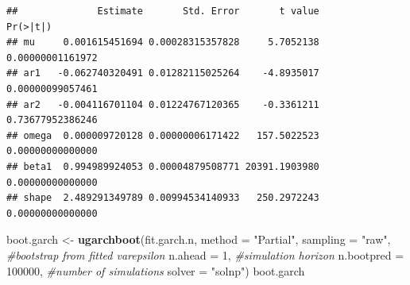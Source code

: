 \documentclass[
]{book}
\newenvironment{Shaded}{\begin{snugshade}}{\end{snugshade}}
\newcommand{\AttributeTok}[1]{\textcolor[rgb]{0.13,0.29,0.53}{#1}}
\newcommand{\CommentTok}[1]{\textcolor[rgb]{0.56,0.35,0.01}{\textit{#1}}}
\newcommand{\DecValTok}[1]{\textcolor[rgb]{0.00,0.00,0.81}{#1}}
\newcommand{\FunctionTok}[1]{\textcolor[rgb]{0.13,0.29,0.53}{\textbf{#1}}}
\newcommand{\NormalTok}[1]{#1}
\newcommand{\OtherTok}[1]{\textcolor[rgb]{0.56,0.35,0.01}{#1}}
\newcommand{\SpecialCharTok}[1]{\textcolor[rgb]{0.81,0.36,0.00}{\textbf{#1}}}
\newcommand{\StringTok}[1]{\textcolor[rgb]{0.31,0.60,0.02}{#1}}
\begin{document}
\begin{Shaded}
\end{Shaded}

\begin{verbatim}
##              Estimate       Std. Error       t value         Pr(>|t|)
## mu     0.001615451694 0.00028315357828     5.7052138 0.00000001161972
## ar1   -0.062740320491 0.01282115025264    -4.8935017 0.00000099057461
## ar2   -0.004116701104 0.01224767120365    -0.3361211 0.73677952386246
## omega  0.000009720128 0.00000006171422   157.5022523 0.00000000000000
## beta1  0.994989924053 0.00004879508771 20391.1903980 0.00000000000000
## shape  2.489291349789 0.00994534140933   250.2972243 0.00000000000000
\end{verbatim}

\begin{Shaded}
\begin{Highlighting}[]
\NormalTok{boot.garch }\OtherTok{\textless{}{-}} \FunctionTok{ugarchboot}\NormalTok{(fit.garch.n,}
                         \AttributeTok{method =} \StringTok{"Partial"}\NormalTok{,}
                         \AttributeTok{sampling =} \StringTok{"raw"}\NormalTok{,  }\CommentTok{\#bootstrap from fitted varepsilon}
                         \AttributeTok{n.ahead =} \DecValTok{1}\NormalTok{,          }\CommentTok{\#simulation horizon}
                         \AttributeTok{n.bootpred =} \DecValTok{100000}\NormalTok{, }\CommentTok{\#number of simulations }
                         \AttributeTok{solver =} \StringTok{"solnp"}\NormalTok{)}
\NormalTok{boot.garch}
\end{Highlighting}
\end{Shaded}
\end{document}
